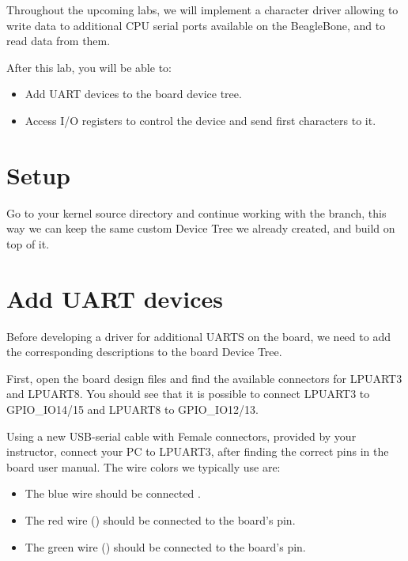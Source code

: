 
Throughout the upcoming labs, we will implement a character driver
allowing to write data to additional CPU serial ports available on
the BeagleBone, and to read data from them.

After this lab, you will be able to:

\begin{itemize}
\item Add UART devices to the board device tree.
\item Access I/O registers to control the device and
      send first characters to it.
\end{itemize}

\section{Setup}

Go to your kernel source directory and continue working with the
 branch, this way we can keep the same custom Device
Tree we already created, and build on top of it.

\section{Add UART devices}

Before developing a driver for additional UARTS on the board, we
need to add the corresponding descriptions to the board Device Tree.

First, open the board design files and find the available connectors for LPUART3
and LPUART8. You should see that it is possible to connect LPUART3 to
GPIO\_IO14/15 and LPUART8 to GPIO\_IO12/13.

Using a new USB-serial cable with Female connectors, provided by your
instructor, connect your PC to LPUART3, after finding the correct pins in the
board user manual. The wire colors we typically use are:

\begin{itemize}
\item The blue wire should be connected .
\item The red wire () should be connected to the board's  pin.
\item The green wire () should be connected to the board's  pin.
\end{itemize}

